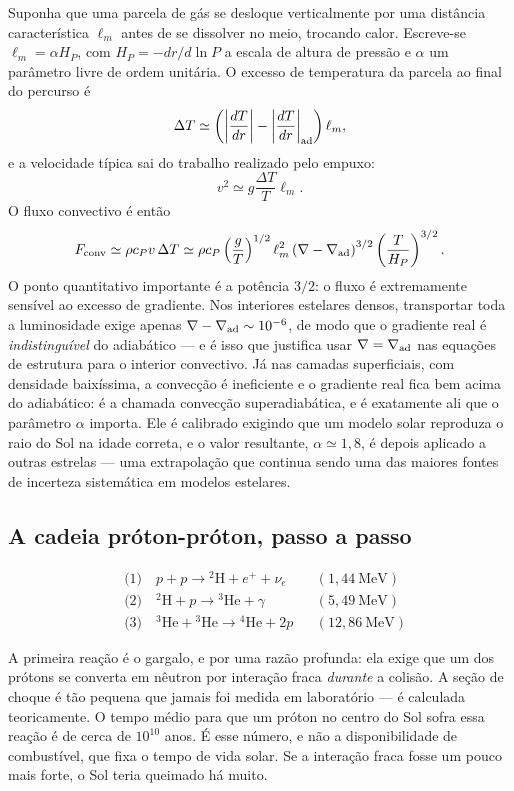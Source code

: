 \documentclass[11pt,a4paper]{article}
\begin{document}
Suponha que uma parcela de gás se desloque verticalmente por uma distância característica $\ell_m$ antes de se dissolver no meio, trocando calor. Escreve-se $\ell_m=\alpha H_P$, com $H_P=-dr/d\ln P$ a escala de altura de pressão e $\alpha$ um parâmetro livre de ordem unitária. O excesso de temperatura da parcela ao final do percurso é
\[
\Delta T\simeq\left(\left|\frac{dT}{dr}\right|-\left|\frac{dT}{dr}\right|_{\rm ad}\right)\ell_m,
\]
e a velocidade típica sai do trabalho realizado pelo empuxo:
\[
v^{2}\simeq g\frac{\Delta T}{T}\ell_m.
\]
O fluxo convectivo é então
\[
F_{\rm conv}\simeq\rho c_Pv\,\Delta T
\simeq\rho c_P\left(\frac{g}{T}\right)^{1/2}\ell_m^{2}\left(\nabla-\nabla_{\rm ad}\right)^{3/2}\left(\frac{T}{H_P}\right)^{3/2}.
\]
O ponto quantitativo importante é a potência $3/2$: o fluxo é extremamente sensível ao excesso de gradiente. Nos interiores estelares densos, transportar toda a luminosidade exige apenas $\nabla-\nabla_{\rm ad}\sim10^{-6}$, de modo que o gradiente real é \emph{indistinguível} do adiabático --- e é isso que justifica usar $\nabla=\nabla_{\rm ad}$ nas equações de estrutura para o interior convectivo. Já nas camadas superficiais, com densidade baixíssima, a convecção é ineficiente e o gradiente real fica bem acima do adiabático: é a chamada convecção superadiabática, e é exatamente ali que o parâmetro $\alpha$ importa. Ele é calibrado exigindo que um modelo solar reproduza o raio do Sol na idade correta, e o valor resultante, $\alpha\simeq1{,}8$, é depois aplicado a outras estrelas --- uma extrapolação que continua sendo uma das maiores fontes de incerteza sistemática em modelos estelares.

\subsection*{A cadeia próton-próton, passo a passo}

\[
\begin{aligned}
&\text{(1)}\quad p+p\to{}^{2}\mathrm{H}+e^{+}+\nu_e &&(1{,}44\ \mathrm{MeV})\\
&\text{(2)}\quad {}^{2}\mathrm{H}+p\to{}^{3}\mathrm{He}+\gamma &&(5{,}49\ \mathrm{MeV})\\
&\text{(3)}\quad {}^{3}\mathrm{He}+{}^{3}\mathrm{He}\to{}^{4}\mathrm{He}+2p &&(12{,}86\ \mathrm{MeV})
\end{aligned}
\]

A primeira reação é o gargalo, e por uma razão profunda: ela exige que um dos prótons se converta em nêutron por interação fraca \emph{durante} a colisão. A seção de choque é tão pequena que jamais foi medida em laboratório --- é calculada teoricamente. O tempo médio para que um próton no centro do Sol sofra essa reação é de cerca de $10^{10}$ anos. É esse número, e não a disponibilidade de combustível, que fixa o tempo de vida solar. Se a interação fraca fosse um pouco mais forte, o Sol teria queimado há muito.
\end{document}
